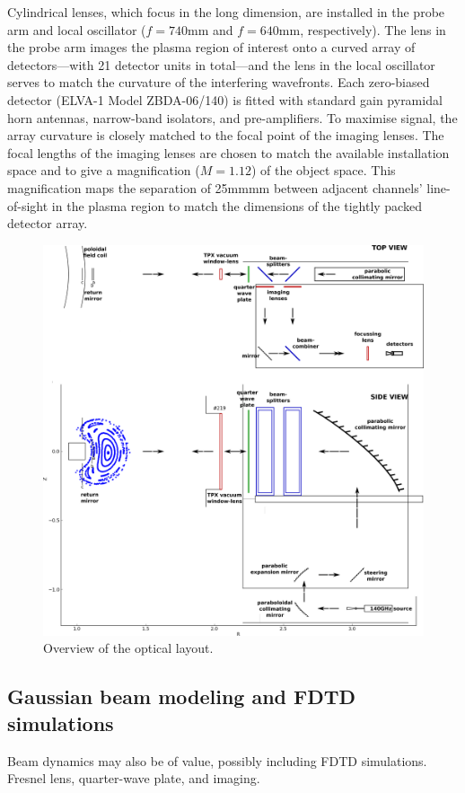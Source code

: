 Cylindrical lenses, which focus in the long dimension, are installed
in the probe arm and local oscillator ($f=740$\ts{}mm and $f=640$\ts{}mm,
respectively). The lens in the probe arm images the plasma region of interest onto a curved
array of detectors---with 21 detector units in total---and the lens in
the local oscillator serves to match the curvature of the interfering wavefronts.
Each zero-biased detector (ELVA-1 Model ZBDA-06/140) is fitted with
standard gain pyramidal horn antennas, narrow-band isolators, and
pre-amplifiers.
To maximise signal, the array curvature is closely matched to the focal point of the imaging
lenses.
The focal lengths of the imaging lenses are chosen to match the
available installation space and to give a magnification ($M = 1.12$)
of the object space.
This magnification maps the separation of 25mm\ts{}mm between adjacent
channels' line-of-sight in the plasma region to match the dimensions
of the tightly packed detector array.

\begin{figure}[htbp]
\includegraphics[width=\columnwidth]{figures/optical_component_layout_phaseii}
\caption{Overview of the optical layout.}
\label{fig:overview_schematic}
\end{figure}

\subsection{Gaussian beam modeling and FDTD simulations}
Beam dynamics may also be of value, possibly including FDTD simulations. Fresnel lens, quarter-wave plate, and imaging.

